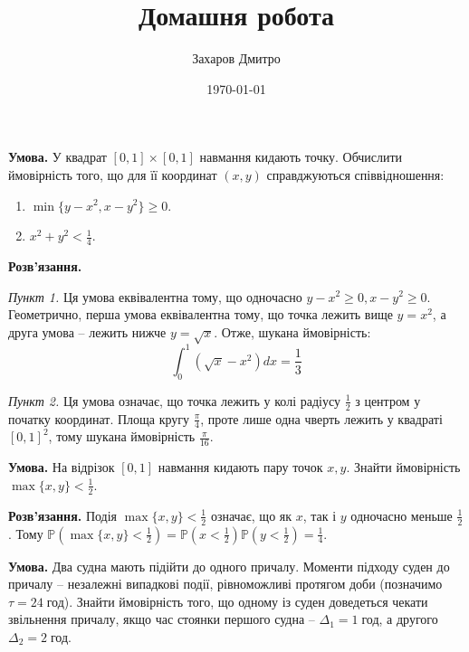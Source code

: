 \documentclass[oneside,solution]{karazin-prob-theory-assign}
\title{Домашня робота}
\author{Захаров Дмитро}
\date{\today}
\begin{document}
\maketitle



\hspace{20px}\textbf{Умова.} У квадрат $[0,1]\times[0,1]$ навмання кидають точку. Обчислити ймовірність того, що для її координат $(x,y)$ справджуються співвідношення:
\begin{enumerate}
    \item $\min\{y-x^2,x-y^2\}\geq 0$.
    \item $x^2+y^2<\frac{1}{4}$.
\end{enumerate}

\textbf{Розв'язання.} 

\textit{Пункт 1.} Ця умова еквівалентна тому, що одночасно $y-x^2\geq 0, x-y^2 \geq 0$. Геометрично, перша умова еквівалентна тому, що точка лежить вище $y=x^2$, а друга умова -- лежить нижче $y=\sqrt{x}$. Отже, шукана ймовірність:
\begin{equation}
    \int_0^1 (\sqrt{x}-x^2)dx = \boxed{\frac{1}{3}}
\end{equation}

\textit{Пункт 2.} Ця умова означає, що точка лежить у колі радіусу $\frac{1}{2}$ з центром у початку координат. Площа кругу $\frac{\pi}{4}$, проте лише одна чверть лежить у квадраті $[0,1]^2$, тому шукана ймовірність $\boxed{\frac{\pi}{16}}$.


\hspace{20px}\textbf{Умова.} На відрізок $[0,1]$ навмання кидають пару точок $x,y$. Знайти ймовірність $\max\{x,y\}<\frac{1}{2}$.

\textbf{Розв'язання.} Подія $\max\{x,y\}<\frac{1}{2}$ означає, що як $x$, так і $y$ одночасно меньше $\frac{1}{2}$. Тому $\mathbb{P}(\max\{x,y\}<\frac{1}{2})=\mathbb{P}(x<\frac{1}{2})\mathbb{P}(y<\frac{1}{2}) = \boxed{\frac{1}{4}}$.


\hspace{20px}\textbf{Умова.} Два судна мають підійти до одного причалу. Моменти підходу суден до причалу -- незалежні випадкові події, рівноможливі протягом доби (позначимо $\tau=24 \; \text{год}$). Знайти ймовірність того, що одному із суден доведеться чекати звільнення причалу, якщо час стоянки першого судна -- $\Delta_1=1 \; \text{год}$, а другого $\Delta_2=2 \; \text{год}$.
\end{document}
